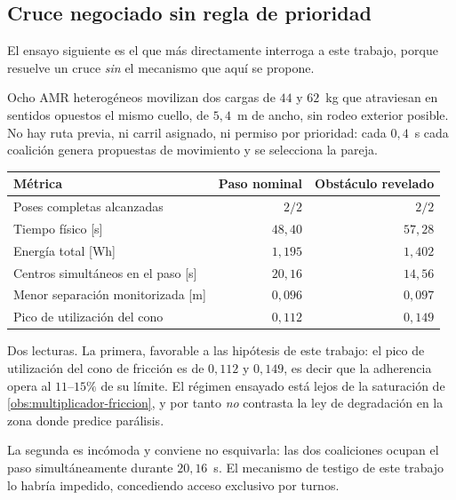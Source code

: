 \subsection{Cruce negociado sin regla de prioridad}

El ensayo siguiente es el que más directamente interroga a este trabajo, porque
resuelve un cruce \emph{sin} el mecanismo que aquí se propone.

\begin{observacion}
\label{obs:ensayo-cruce}
Ocho AMR heterogéneos movilizan dos cargas de $44$ y $62$~kg que atraviesan en
sentidos opuestos el mismo cuello, de $5{,}4$~m de ancho, sin rodeo exterior
posible. No hay ruta previa, ni carril asignado, ni permiso por prioridad: cada
$0{,}4$~s cada coalición genera propuestas de movimiento y se selecciona la
pareja.

\begin{center}\small
\begin{tabular}{@{}lrr@{}}
\toprule
Métrica & Paso nominal & Obstáculo revelado \\
\midrule
Poses completas alcanzadas & $2/2$ & $2/2$ \\
Tiempo físico [s] & $48{,}40$ & $57{,}28$ \\
Energía total [Wh] & $1{,}195$ & $1{,}402$ \\
Centros simultáneos en el paso [s] & $20{,}16$ & $14{,}56$ \\
Menor separación monitorizada [m] & $0{,}096$ & $0{,}097$ \\
Pico de utilización del cono & $0{,}112$ & $0{,}149$ \\
\bottomrule
\end{tabular}
\end{center}

Dos lecturas. La primera, favorable a las hipótesis de este trabajo: el pico de
utilización del cono de fricción es de $0{,}112$ y $0{,}149$, es decir que la
adherencia opera al $11$–$15\%$ de su límite. El régimen ensayado está lejos de
la saturación de \cref{obs:multiplicador-friccion}, y por tanto \emph{no}
contrasta la ley de degradación en la zona donde predice parálisis.

La segunda es incómoda y conviene no esquivarla: las dos coaliciones ocupan el
paso simultáneamente durante $20{,}16$~s. El mecanismo de testigo de este trabajo
lo habría impedido, concediendo acceso exclusivo por turnos.
\end{observacion}

